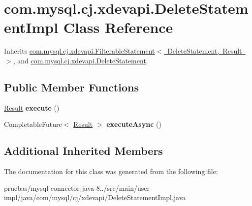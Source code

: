 \hypertarget{classcom_1_1mysql_1_1cj_1_1xdevapi_1_1_delete_statement_impl}{}\section{com.\+mysql.\+cj.\+xdevapi.\+Delete\+Statement\+Impl Class Reference}
\label{classcom_1_1mysql_1_1cj_1_1xdevapi_1_1_delete_statement_impl}


Inherits \mbox{\hyperlink{classcom_1_1mysql_1_1cj_1_1xdevapi_1_1_filterable_statement}{com.\+mysql.\+cj.\+xdevapi.\+Filterable\+Statement$<$ Delete\+Statement, Result $>$}}, and \mbox{\hyperlink{interfacecom_1_1mysql_1_1cj_1_1xdevapi_1_1_delete_statement}{com.\+mysql.\+cj.\+xdevapi.\+Delete\+Statement}}.

\subsection*{Public Member Functions}
\begin{DoxyCompactItemize}
\item 
\mbox{\label{classcom_1_1mysql_1_1cj_1_1xdevapi_1_1_delete_statement_impl_af9c07b8df581500c17654da099165cec}} 
\mbox{\hyperlink{interfacecom_1_1mysql_1_1cj_1_1xdevapi_1_1_result}{Result}} {\bfseries execute} ()
\item 
\mbox{\label{classcom_1_1mysql_1_1cj_1_1xdevapi_1_1_delete_statement_impl_afc882987a4cfd437aa2b02685f10b3eb}} 
Completable\+Future$<$ \mbox{\hyperlink{interfacecom_1_1mysql_1_1cj_1_1xdevapi_1_1_result}{Result}} $>$ {\bfseries execute\+Async} ()
\end{DoxyCompactItemize}
\subsection*{Additional Inherited Members}


The documentation for this class was generated from the following file\+:\begin{DoxyCompactItemize}
\item 
pruebas/mysql-\/connector-\/java-\/8../src/main/user-\/impl/java/com/mysql/cj/xdevapi/Delete\+Statement\+Impl.\+java\end{DoxyCompactItemize}
